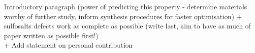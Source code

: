 \documentclass[11pt, twoside]{report}
\begin{document}
Introductory paragraph (power of predicting this property - determine materials worthy of further study, inform synthesis procedures for faster optimisation) + sulfosalts defects work as complete as possible (write last, aim to have as much of paper written as possible first!)\\

+ Add statement on personal contribution















\end{document}
